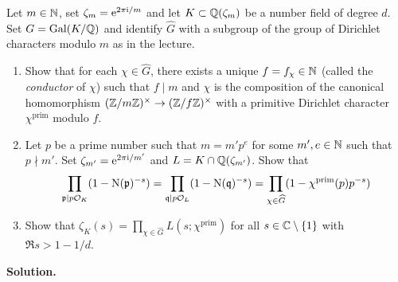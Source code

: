 \documentclass[a4paper,11pt]{article}
\begin{document}
Let $m \in \mathbb{N}$, set $\zeta_m = \mathrm e^{2 \pi \mathrm i/m}$ and let $K \subset \mathbb{Q}(\zeta_m)$
be a number field of degree $d$. Set $G = \operatorname{Gal}(K/\mathbb{Q})$ and identify $\hat G$ with a 
subgroup of the group of Dirichlet characters modulo $m$ as in the lecture.
\begin{enumerate}
    \item Show that for each $\chi \in \hat G$, there exists a unique $f = f_\chi 
        \in \mathbb{N}$ (called the \emph{conductor} of $\chi$) such that $f \mid m$
        and $\chi$ is the composition of the canonical homomorphism
        $(\mathbb{Z}/m\mathbb{Z})^\times \to (\mathbb{Z}/f\mathbb{Z})^\times$ with a primitive Dirichlet character
        $\chi^{\mathrm{prim}}$ modulo $f$.
    \item Let $p$ be a prime number such
        that $m = m'p^e$ for some $m', e \in \mathbb{N}$ such
        that $p \nmid m'$. Set $\zeta_{m'} = \mathrm e^{2 \pi \mathrm i /m'}$ and $L = 
        K\cap \mathbb{Q}(\zeta_{m'})$. Show that 
        \begin{equation*}
            \prod_{\mathfrak{p} \mid p\mathcal{O}_K} (1 - \operatorname{N}(\mathfrak{p})^{-s}) = 
            \prod_{\mathfrak{q} \mid p\mathcal{O}_L} (1 - \operatorname{N}(\mathfrak{q})^{-s}) =
            \prod_{\chi \in \widehat G} (1 - \chi^{\mathrm{prim}}(p) p^{-s}) 
        \end{equation*}
    \item Show that $\zeta_K(s) = \prod_{\chi \in \hat G} L(s;\chi^{\mathrm{prim}})$
        for all $s \in \mathbb{C}\setminus \{1\}$ with $\Re s > 1-1/d$.
\end{enumerate}
\textbf{Solution.}
\end{document}
